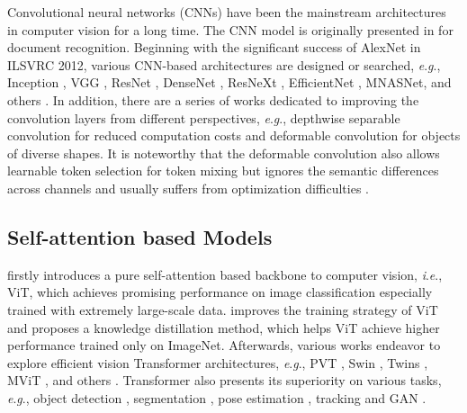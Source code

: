 \documentclass[letterpaper]{article} \usepackage{aaai23v}  \usepackage{times}  \usepackage{helvet}  \usepackage{courier}  \usepackage[hyphens]{url}  \usepackage{graphicx} \urlstyle{rm} \def\UrlFont{\rm}  \usepackage{caption} \frenchspacing  \setlength{\pdfpagewidth}{8.5in}  \setlength{\pdfpageheight}{11in}  \usepackage{algorithm}
\newcommand{\ieno}{\textit{i}.\textit{e}.}
\newcommand{\egno}{\textit{e}.\textit{g}.} \newcommand{\etcno}{\textit{etc}} \newcommand{\etal}{\textit{et al.}}
\newcommand{\imnt}{ImageNet}
\begin{document}
Convolutional neural networks (CNNs) have been the mainstream architectures in computer vision for a long time.
The CNN model is originally presented in \cite{lecun1998gradientlenet} for document recognition. Beginning with the significant success of AlexNet \cite{krizhevsky2012imagenetalexnet} in ILSVRC 2012, various CNN-based architectures are designed or searched, \egno, Inception \cite{szegedy2015GoogleNet,szegedy2016InceptionV3,szegedy2017inceptionV4}, VGG \cite{simonyan2014veryVGG}, ResNet \cite{he2016deepresnet}, DenseNet \cite{huang2017DenseNet}, ResNeXt \cite{xie2017ResNeXt}, EfficientNet \cite{tan2019EfficientNet}, MNASNet, \cite{tan2019MNASNet} and others \cite{wang2020HRNet,ding2021RepVGG,liu2022convnext}. In addition, there are a series of works dedicated to improving the convolution layers from different perspectives, \egno, depthwise separable convolution \cite{chollet2017xception,howard2017Mobilenetv1,sandler2018Mobilenetv2} for reduced computation costs and deformable convolution \cite{dai2017deformabledcn,zhu2019DCNV2} for objects of diverse shapes.
It is noteworthy that the deformable convolution also allows learnable token selection for token mixing but ignores the semantic differences across channels \cite{bau2020understanding,wu2021stylespace} and
usually suffers from optimization difficulties \cite{chan2021understanding}.


\subsection{Self-attention based Models}

\cite{alexander2021vit} firstly introduces a pure self-attention based backbone to computer vision, \ieno, ViT, which achieves promising performance on image classification especially trained with extremely large-scale data. 
\cite{touvron2021deit} improves the training strategy of ViT and proposes a knowledge distillation method, which helps ViT achieve higher performance 
trained only on \imnt. 
Afterwards, various works endeavor to explore efficient vision Transformer architectures,
\egno, PVT \cite{wang2021pyramidpvt,wang2021pvtv2}, Swin \cite{liu2021swin,liu2021swinv2}, Twins \cite{chu2021twins}, MViT \cite{yan2022MViT,li2021MViT2}, and others \cite{chu2021CPVT,dong2021cswin,ali2021XCiT,touvron2021CaiT,yang2021Focal,bertasius2021TimeSformer,li2022UniFormer}. 
Transformer also presents its superiority on various tasks, \egno, object detection \cite{carion2020DETR,zhu2021deformabledetr}, segmentation \cite{cheng2021MaskFormer,cheng2021Mask2Former,xie2021SegFormer,zheng2021SETR}, pose estimation \cite{lin2021PoseTransformer}, tracking \cite{wang2021TransTrack,chen2021TransT} and GAN \cite{jiang2021TransGAN,xu2021STransGAN}. 
\end{document}
